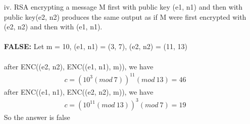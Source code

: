 \documentclass[12pt,letterpaper]{article}
\begin{document}
\begin{enumerate}
\begin{proof}
        let $shift1[i]$ = the position of $k^1_i$ in alphabet (e.g. In English, a's position = 0,  .. z = 25)\\
        let $shift2[i]$ = the position of $k^2_i$ in alphabet\\
        \\ we focus on one character $x_i$ and the rest of the characters will follow the same pattern.\\\\
        after ENC(k2, ENC(k1, plaintext)) 
        \begin{align*}
          first, \  character \ x_i \  is \ shifted \ to \ the \ right \ by  \ shift1[i \  mod \  k_1's \ length] \\
          then, \  character \ x_i \  is \ shifted \ to \ the \ right \ by  \ shift2[i \  mod  \ k_2's \ length] \\
          (if\ it\ overflows, \ wrap\ around)
        \end{align*}
        \\in the same way, ENC(k1, ENC(k2, plaintext)) 
         \begin{align*}
          first, \  character \ x_i \  is \ shifted \ to \ the \ right \ by  \ shift2[i \  mod \  k_2's \ length] \\
          then, \  character \ x_i \  is \ shifted \ to \ the \ right \ by  \ shift1[i \  mod  \ k_1's \ length] \\
          (if\ it\ overflows, \ wrap\ around)
        \end{align*}
        \\
        Since "shifting character to the right" is commutative, this type of encryption is commutative, too
       \end{proof}
       \item[iv.]
       RSA encrypting a message M first with public key (e1, n1) and then with public key(e2, n2) produces the same output as if M were first encrypted with (e2, n2) and then with (e1, n1).\\\\
       \textbf{FALSE:}
          Let m = 10, (e1, n1) = (3, 7), (e2, n2) = (11, 13)\\\\
          after ENC((e2, n2), ENC((e1, n1), m)), we have 
          \begin{align*}
              c =  (10^{3} (mod \ 7))^{11} (mod \ 13) = 46
          \end{align*}
          after ENC((e1, n1), ENC((e2, n2), m)), we have 
          \begin{align*}
              c =  (10^{11} (mod \ 13))^{3} (mod \ 7) = 19
          \end{align*}
      So the answer is false

       
    \end{enumerate}
\end{document}
